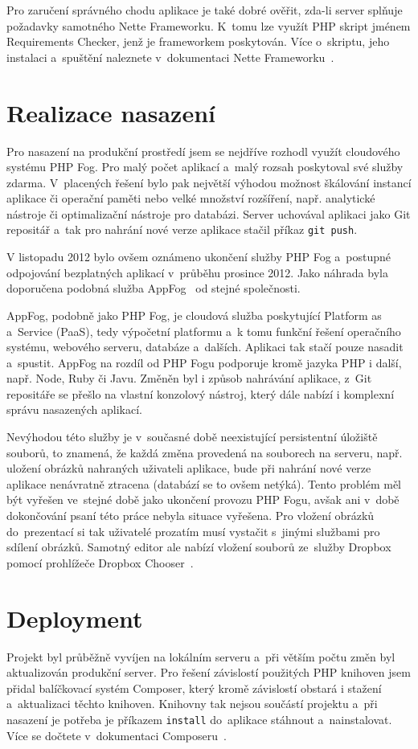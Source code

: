 \documentclass[11pt,twoside,a4paper]{book}
\newcommand*{\nomExpl}[2]{#2 (#1)\nomenclature{#1}{#2}} 	%
\begin{document}
Pro zaručení správného chodu aplikace je také dobré ověřit, zda-li server splňuje požadavky samotného Nette Frameworku. K~tomu lze využít PHP skript jménem Requirements Checker, jenž je frameworkem poskytován. Více o~skriptu, jeho instalaci a~spuštění naleznete v~dokumentaci Nette Frameworku~\cite{checker}.

\section{Realizace nasazení}
Pro nasazení na produkční prostředí jsem se nejdříve rozhodl využít cloudového systému PHP Fog. Pro malý počet aplikací a~malý rozsah poskytoval své služby zdarma. V~placených řešení bylo pak největší výhodou možnost škálování instancí aplikace či operační paměti nebo velké množství rozšíření, např. analytické nástroje či optimalizační nástroje pro databázi. Server uchovával aplikaci jako Git repositář a~tak pro nahrání nové verze aplikace stačil příkaz \verb|git push|.

V listopadu 2012 bylo ovšem oznámeno ukončení služby PHP Fog a~postupné odpojování bezplatných aplikací v~průběhu prosince 2012. Jako náhrada byla doporučena podobná služba AppFog~\cite{appfog} od stejné společnosti.~\cite{phpfogdiscont}

AppFog, podobně jako PHP Fog, je cloudová služba poskytující \nomExpl{PaaS}{Platform as a~Service}, tedy výpočetní platformu a~k tomu funkční řešení operačního systému, webového serveru, databáze a~dalších. Aplikaci tak stačí pouze nasadit a~spustit. AppFog na rozdíl od PHP Fogu podporuje kromě jazyka PHP i další, např. Node, Ruby či Javu. Změněn byl i způsob nahrávání aplikace, z~Git repositáře se přešlo na vlastní konzolový nástroj, který dále nabízí i komplexní správu nasazených aplikací.

Nevýhodou této služby je v~současné době neexistující persistentní úložiště souborů, to znamená, že každá změna provedená na souborech na serveru, např. uložení obrázků nahraných uživateli aplikace, bude při nahrání nové verze aplikace nenávratně ztracena (databází se to ovšem netýká). Tento problém měl být vyřešen ve~stejné době jako ukončení provozu PHP Fogu, avšak ani v~době dokončování psaní této práce nebyla situace vyřešena. Pro vložení obrázků do~prezentací si tak uživatelé prozatím musí vystačit s~jinými službami pro sdílení obrázků. Samotný editor ale nabízí vložení souborů ze~služby Dropbox pomocí prohlížeče Dropbox Chooser~\cite{dropboxchooser}.

\section{Deployment}
Projekt byl průběžně vyvíjen na lokálním serveru a~při větším počtu změn byl aktualizován produkční server. Pro řešení závislostí použitých PHP knihoven jsem přidal balíčkovací systém Composer, který kromě závislostí obstará i stažení a~aktualizaci těchto knihoven. Knihovny tak nejsou součástí projektu a~při nasazení je potřeba je příkazem \verb|install| do~aplikace stáhnout a~nainstalovat. Více se dočtete v~dokumentaci Composeru~\cite{composer}.
\end{document}

